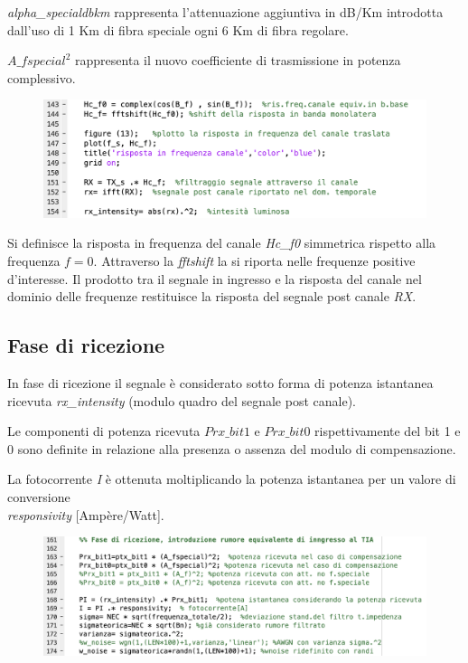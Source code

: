 \documentclass[12pt, a4paper]{article}
\begin{document}
\textit{alpha\_specialdbkm} rappresenta l'attenuazione aggiuntiva in dB/Km introdotta dall'uso di 1 Km di fibra speciale ogni 6 Km di fibra regolare.

$A\_fspecial^2$ rappresenta il nuovo coefficiente di trasmissione in potenza complessivo.

\begin{figure}[h!]
\centering
\includegraphics[scale=0.7]{passaggiocanaleintesity.png}
\caption{}
\label{}
\end{figure}

\newpage
Si definisce la risposta in frequenza del canale \textit{Hc\_f0} simmetrica rispetto alla frequenza $f = 0$. Attraverso la \textit{fftshift} la si riporta nelle frequenze positive d'interesse. Il prodotto tra il segnale in ingresso e la risposta del canale nel dominio delle frequenze restituisce la risposta del segnale post canale \textit{RX}.




\subsection{Fase di ricezione}
\label{sub:faseric}

In fase di ricezione il segnale è considerato sotto forma di potenza istantanea ricevuta \textit{rx\_intensity} (modulo quadro del segnale post canale).

Le componenti di potenza ricevuta $Prx\_bit1$ e $Prx\_bit0$  rispettivamente del bit 1 e 0 sono definite in relazione alla presenza o assenza del modulo di compensazione.

La fotocorrente \textit{I} è ottenuta moltiplicando la potenza istantanea per un valore di conversione\\ \textit{responsivity} [Ampère/Watt].

\begin{figure}[h!]
\centering
\includegraphics[scale=0.7]{faseric.png}
\label{}
\end{figure}
\end{document}
